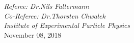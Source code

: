 \begin{titlepage}
\begin{addmargin}[1.5cm]{0cm}
\begin{center}
{  %
  \large{\textit{Referee: Dr.\;Nils Faltermann}}\\
  \large{\textit{Co-Referee: Dr.\;Thorsten Chwalek}}\\
   \vspace{0.2 cm}
\large{\textit{Institute of Experimental Particle Physics}}\\


  \vspace{1.0cm}
  \large{November 08, 2018}%
}
\end{center}
\end{addmargin}
\end{titlepage}
